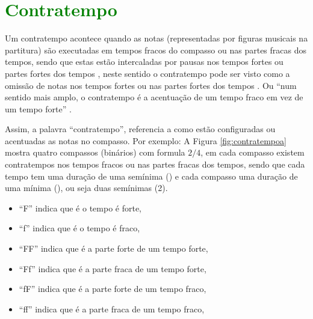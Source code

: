 \section{\textcolor{green}{Contratempo}}
Um contratempo acontece quando as notas (representadas por figuras musicais na partitura) 
são executadas em tempos fracos do compasso
ou nas partes fracas dos tempos, sendo que estas estão intercaladas por pausas nos tempos
fortes ou partes fortes dos tempos \cite[pp. 16]{mascarenhascurso} 
\cite[pp. 36]{azevedocompor}, neste sentido o contratempo pode ser visto como a 
omissão de notas nos tempos fortes ou nas partes fortes dos tempos \cite[pp. 146]{medteoria}.
Ou ``num sentido mais amplo, o contratempo é a acentuação de um tempo fraco em vez de um tempo forte'' \cite[pp. 147]{medteoria}. 

Assim, a palavra ``contratempo'', referencia a como estão configuradas ou acentuadas 
as notas no compasso. Por exemplo:
A Figura \ref{fig:contratempoa} mostra 
quatro compassos (binários) com formula $2/4$, em cada compasso existem 
contratempos nos tempos fracos ou nas partes fracas dos tempos, sendo que cada tempo
tem uma duração de uma semínima (\quarternote) e cada compasso uma duração 
de uma mínima (\halfnote), ou seja duas semínimas (2\quarternote). 
\begin{itemize}
\item ``F''  indica que é o tempo é forte, 
\item ``f''  indica que é o tempo é fraco,
\item ``FF'' indica que é a parte forte de um tempo forte,
\item ``Ff'' indica que é a parte fraca de um tempo forte,
\item ``fF'' indica que é a parte forte de um tempo fraco,
\item ``ff'' indica que é a parte fraca de um tempo fraco, 
\end{itemize} 

